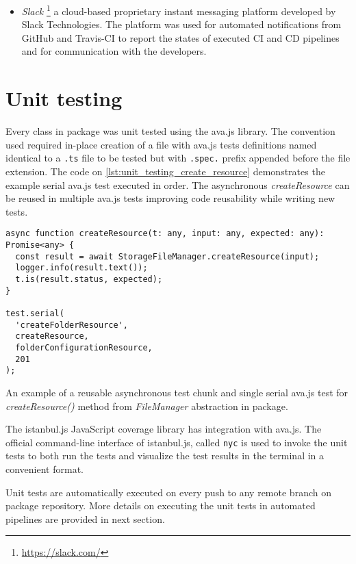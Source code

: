 \begin{itemize}
    \item \textit{Slack} \footnote{\url{https://slack.com/}} a cloud-based proprietary instant messaging platform developed by Slack Technologies. The platform was used for automated notifications from GitHub and Travis-CI to report the states of executed CI and CD pipelines and for communication with the \lpa{} developers.
\end{itemize} 

\section{Unit testing}

Every class in \lpas{} package was unit tested using the ava.js library. The convention used required in-place creation of a file with ava.js tests definitions named identical to a \texttt{.ts} file to be tested but with \texttt{.spec.} prefix appended before the file extension. The code on \autoref{lst:unit_testing_create_resource} demonstrates the example serial ava.js test executed in order. The asynchronous \textit{createResource} can be reused in multiple ava.js tests improving code reusability while writing new tests.

\begin{listing}[H]    
\begin{verbatim}
async function createResource(t: any, input: any, expected: any): Promise<any> {
  const result = await StorageFileManager.createResource(input);
  logger.info(result.text());
  t.is(result.status, expected);
}

test.serial(
  'createFolderResource',
  createResource,
  folderConfigurationResource,
  201
);
\end{verbatim}
\caption{An example of a reusable asynchronous test chunk and single serial ava.js test for \textit{createResource()} method from \textit{FileManager} abstraction in \lpas{} package.} 
\label{lst:unit_testing_create_resource}
\end{listing}

The istanbul.js JavaScript coverage library has integration with ava.js. The official command-line interface of istanbul.js, called \texttt{nyc} is used to invoke the unit tests to both run the tests and visualize the test results in the terminal in a convenient format.

Unit tests are automatically executed on every push to any remote branch on \lpas{} package repository. More details on executing the unit tests in automated pipelines are provided in next section.

